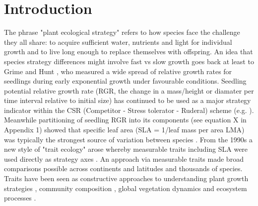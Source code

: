 \documentclass[a4paper]{article}\usepackage[]{graphicx}\usepackage[]{color}
\begin{document}
\section*{Introduction}\label{introduction}
The phrase "plant ecological strategy" refers to how species face the challenge they all share:  to acquire sufficient water, nutrients and light for individual growth and to live long enough to replace themselves with offspring. An idea that species strategy differences might involve fast vs slow growth goes back at least to Grime and Hunt \citeyearpar{Grime:1975gr}, who measured a wide spread of relative growth rates for seedlings during early exponential growth under favourable conditions. Seedling potential relative growth rate (RGR, the change in a mass/height or diamater per time interval relative to initial size) has continued to be used as a major strategy indicator within the CSR (Competitor - Stress tolerator - Ruderal) scheme (e.g. \citealt{grime1979plant, Grime:1997wm}). Meanwhile partitioning of seedling RGR into its components (see equation X in Appendix 1) showed that specific leaf area (SLA = 1/leaf mass per area LMA) was typically the strongest source of variation between species \citep{Poorter:1989tx}. From the 1990s a new style of "trait ecology" arose whereby measurable traits including SLA were used directly as strategy axes \citep{Westoby:2002ft}. An approach via measurable traits made broad comparisons possible across continents and latitudes and thousands of species. Traits have been seen as constructive approaches to understanding plant growth strategies \citep{Grime:1977kc,Chapin:1980gz}, community composition \citep{Lavorel:2002ff,Shipley:2006ie}, global vegetation dynamics \citep{Scheiter:2013ed} and ecosystem processes \citep{Lavorel:2002ff}.
\end{document}
